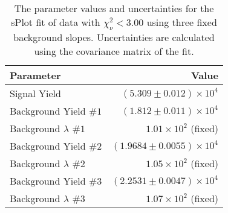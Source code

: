 
\begin{table}[ht]
    \begin{center}
        \begin{tabular}{lr}\toprule
            Parameter & Value \\\midrule
            Signal Yield & $(5.309 \pm 0.012) \times 10^{4}$ \\
            Background Yield $\#1$ & $(1.812 \pm 0.011) \times 10^{4}$ \\
            Background $\lambda$ $\#1$ & $1.01 \times 10^{2}$ (fixed) \\
            Background Yield $\#2$ & $(1.9684 \pm 0.0055) \times 10^{4}$ \\
            Background $\lambda$ $\#2$ & $1.05 \times 10^{2}$ (fixed) \\
            Background Yield $\#3$ & $(2.2531 \pm 0.0047) \times 10^{4}$ \\
            Background $\lambda$ $\#3$ & $1.07 \times 10^{2}$ (fixed) \\\bottomrule
        \end{tabular}
        \caption{The parameter values and uncertainties for the sPlot fit of data with $\chi^2_\nu < 3.00$ using three fixed background slopes. Uncertainties are calculated using the covariance matrix of the fit.}\label{tab:splot-fit-results-chisqdof-3.00-fixed-3}
    \end{center}
\end{table}
